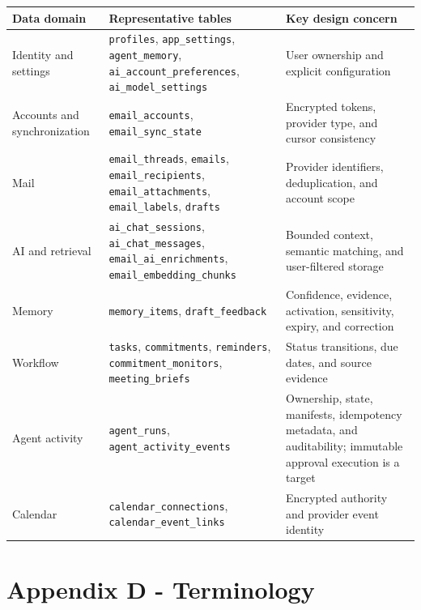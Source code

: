 \documentclass[
]{report}
\begin{document}
\begin{longtable}[]{@{}p{}p{}p{}@{}}
\toprule\noalign{}
Data domain & Representative tables & Key design concern \\
\midrule\noalign{}
\endhead
\bottomrule\noalign{}
\endlastfoot
Identity and settings & \texttt{profiles}, \texttt{app\_settings},
\texttt{agent\_memory}, \texttt{ai\_account\_preferences},
\texttt{ai\_model\_settings} & User ownership and explicit
configuration \\
Accounts and synchronization & \texttt{email\_accounts},
\texttt{email\_sync\_state} & Encrypted tokens, provider type, and
cursor consistency \\
Mail & \texttt{email\_threads}, \texttt{emails},
\texttt{email\_recipients}, \texttt{email\_attachments},
\texttt{email\_labels}, \texttt{drafts} & Provider identifiers,
deduplication, and account scope \\
AI and retrieval & \texttt{ai\_chat\_sessions},
\texttt{ai\_chat\_messages}, \texttt{email\_ai\_enrichments},
\texttt{email\_embedding\_chunks} & Bounded context, semantic matching,
and user-filtered storage \\
Memory & \texttt{memory\_items}, \texttt{draft\_feedback} & Confidence,
evidence, activation, sensitivity, expiry, and correction \\
Workflow & \texttt{tasks}, \texttt{commitments}, \texttt{reminders},
\texttt{commitment\_monitors}, \texttt{meeting\_briefs} & Status
transitions, due dates, and source evidence \\
Agent activity & \texttt{agent\_runs}, \texttt{agent\_activity\_events}
& Ownership, state, manifests, idempotency metadata, and auditability;
immutable approval execution is a target \\
Calendar & \texttt{calendar\_connections},
\texttt{calendar\_event\_links} & Encrypted authority and provider event
identity \\
\end{longtable}

\section{Appendix D - Terminology}\label{appendix-d---terminology}
\end{document}

